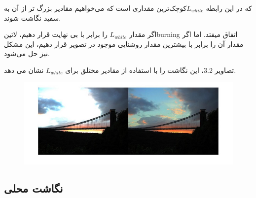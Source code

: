 که در این رابطه $ L_{white}$کوچک‌ترین مقداری است که می‌خواهیم مقادیر بزرگ تر از آن به سفید نگاشت شوند.

اگر مقدار  $ L_{white}$ را برابر با بی نهایت قرار دهیم، 
‌لاتین{burning } 
اتفاق میفتد. اما اگر مقدار آن را برابر با بیشترین مقدار روشنایی موجود در تصویر قرار دهیم، این مشکل نیز حل می‌شود.

تصاویر 3.2، این نگاشت را با استفاده از مقادیر مختلق برای 
$ L_{white}$ 
نشان می دهد.

\begin{figure}[!htb]
	\includegraphics[width=\linewidth]{images/reinhardw}
	\caption{}\label{fig:logtonemap}
	\endminipage\hfill
\end{figure}


  
 \subsection{نگاشت محلی}
  
